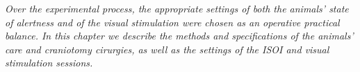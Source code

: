 \label{cap:ExperimentalMethods}

\textit{Over the experimental process, the appropriate settings of both the animals' state of alertness and of the visual stimulation were chosen as an operative practical balance. In this chapter we describe the methods and specifications of the animals' care and craniotomy cirurgies, as well as the settings of the ISOI and visual stimulation sessions.}






\cleardoublepage